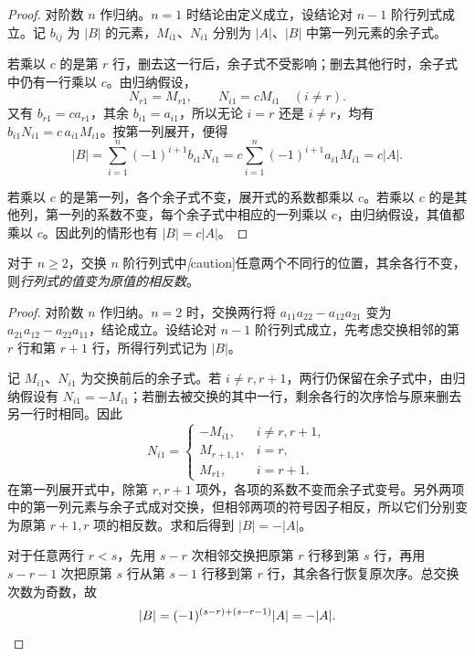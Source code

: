 \begin{proof}
对阶数 $n$ 作归纳。$n=1$ 时结论由定义成立，设结论对 $n-1$ 阶行列式成立。记 $b_{ij}$ 为 $|B|$ 的元素，$M_{i1}$、$N_{i1}$ 分别为 $|A|$、$|B|$ 中第一列元素的余子式。

若乘以 $c$ 的是第 $r$ 行，删去这一行后，余子式不受影响；删去其他行时，余子式中仍有一行乘以 $c$。由归纳假设，
\[
    N_{r1}=M_{r1},\qquad N_{i1}=cM_{i1}\quad(i\ne r).
\]
又有 $b_{r1}=ca_{r1}$，其余 $b_{i1}=a_{i1}$，所以无论 $i=r$ 还是 $i\ne r$，均有 $b_{i1}N_{i1}=c\,a_{i1}M_{i1}$。按第一列展开，便得
\[
    |B|=\sum_{i=1}^{n}(-1)^{i+1}b_{i1}N_{i1}
        =c\sum_{i=1}^{n}(-1)^{i+1}a_{i1}M_{i1}=c|A|.
\]

若乘以 $c$ 的是第一列，各个余子式不变，展开式的系数都乘以 $c$。若乘以 $c$ 的是其他列，第一列的系数不变，每个余子式中相应的一列乘以 $c$，由归纳假设，其值都乘以 $c$。因此列的情形也有 $|B|=c|A|$。
\end{proof}

\begin{property}[交换两行]
\label{prop:determinant-row-swap}
对于 $n\geq 2$，交换 $n$ 阶行列式中\emph[caution]{任意两个不同行}的位置，其余各行不变，则\emph{行列式的值变为原值的相反数}。
\end{property}

\begin{proof}
对阶数 $n$ 作归纳。$n=2$ 时，交换两行将 $a_{11}a_{22}-a_{12}a_{21}$ 变为 $a_{21}a_{12}-a_{22}a_{11}$，结论成立。设结论对 $n-1$ 阶行列式成立，先考虑交换相邻的第 $r$ 行和第 $r+1$ 行，所得行列式记为 $|B|$。

记 $M_{i1}$、$N_{i1}$ 为交换前后的余子式。若 $i\ne r,r+1$，两行仍保留在余子式中，由归纳假设有 $N_{i1}=-M_{i1}$；若删去被交换的其中一行，剩余各行的次序恰与原来删去另一行时相同。因此
\[
    N_{i1}=\begin{cases}
        -M_{i1}, & i\ne r,r+1,\\
        M_{r+1,1}, & i=r,\\
        M_{r1}, & i=r+1.
    \end{cases}
\]
在第一列展开式中，除第 $r,r+1$ 项外，各项的系数不变而余子式变号。另外两项中的第一列元素与余子式成对交换，但相邻两项的符号因子相反，所以它们分别变为原第 $r+1,r$ 项的相反数。求和后得到 $|B|=-|A|$。

对于任意两行 $r<s$，先用 $s-r$ 次相邻交换把原第 $r$ 行移到第 $s$ 行，再用 $s-r-1$ 次把原第 $s$ 行从第 $s-1$ 行移到第 $r$ 行，其余各行恢复原次序。总交换次数为奇数，故
\[
    |B|=(-1)^{(s-r)+(s-r-1)}|A|=-|A|.\qedhere
\]
\end{proof}

